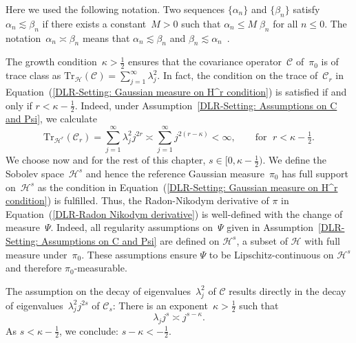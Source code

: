 Here we used the following notation. Two sequences $\{\alpha_n\}$ and $\{\beta_n\}$ satisfy $\alpha_n \lesssim  \beta_n$ if there exists a constant~$M>0$ such that $\alpha_n \leq M \; \beta_n$ for all $n \leq 0$. The notation~$\alpha_n \asymp \beta_n$ means that $\alpha_n \lesssim  \beta_n $ and $ \beta_n \lesssim  \alpha_n$~\autocite{Pillai2012}.

\begin{rem}
 The growth condition~$\kappa > \tfrac{1}{2}$ ensures that the covariance operator~$\mathcal{C}$ of~$\pi_0$ is of trace class as $\text{Tr}_{\mathcal{H}}(\mathcal{C}) = \sum_{j=1}^{\infty} \lambda_j^2$. In fact, the condition on the trace of~$\mathcal{C}_r$ in Equation~(\ref{DLR-Setting: Gaussian measure on H^r condition}) is satisfied if and only if $r < \kappa - \tfrac{1}{2}$. Indeed, under Assumption~\ref{DLR-Setting: Assumptions on C and Psi}, we calculate
 \begin{equation*}
  \text{Tr}_{\mathcal{H}^r}(\mathcal{C}_r) = \sum_{j=1}^{\infty} \lambda_j^2 j^{2r}  \asymp \sum_{j=1}^{\infty} j^{2(r-\kappa)} < \infty, \qquad \text{for } \; r < \kappa - \tfrac{1}{2}.
 \end{equation*}
 We choose now and for the rest of this chapter, $s \in [0, \kappa - \tfrac{1}{2})$. We define the Sobolev space~$\mathcal{H}^s$ and hence the reference Gaussian measure~$\pi_0$ has full support on~$\mathcal{H}^s$ as the condition in Equation~(\ref{DLR-Setting: Gaussian measure on H^r condition}) is fulfilled. Thus, the Radon-Nikodym derivative of $\pi$ in Equation~(\ref{DLR-Radon Nikodym derivative}) is well-defined with the change of measure~$\Psi$. Indeed, all regularity assumptions on~$\Psi$ given in Assumption~\ref{DLR-Setting: Assumptions on C and Psi} are defined on $\mathcal{H}^s$, a subset of $\mathcal{H}$ with full measure under~$\pi_0$. These assumptions ensure $\Psi$ to be Lipschitz-continuous on $\mathcal{H}^s$ and therefore $\pi_0$-measurable. 

\end{rem}


\begin{rem}
  \label{DLR: Assumption on C_s}
  The assumption on the decay of eigenvalues~$\lambda_j^2$ of $\mathcal{C}$ results directly in the decay of eigenvalues~$\lambda_j^2 j^{2s}$ of $\mathcal{C}_s$: There is an exponent~$\kappa > \tfrac{1}{2}$ such that
 \begin{equation}
 \label{DLR-Seeting: Assumption on decay of eigenvalues of C_s}
 \lambda_j j^{s} \asymp j^{s - \kappa}.
 \end{equation}
 As $s < \kappa -\tfrac{1}{2}$, we conclude: $ s -\kappa < - \tfrac{1}{2} $.
\end{rem}



